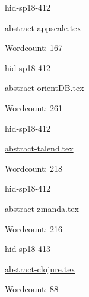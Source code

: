 \begin{IU}

hid-sp18-412

\href{https://github.com/cloudmesh-community/hid-sp18-412/blob/master//technology/abstract-appscale.tex}{abstract-appscale.tex}

 

Wordcount: 167

\end{IU}



\begin{IU}

hid-sp18-412

\href{https://github.com/cloudmesh-community/hid-sp18-412/blob/master//technology/abstract-orientDB.tex}{abstract-orientDB.tex}

 

Wordcount: 261

\end{IU}



\begin{IU}

hid-sp18-412

\href{https://github.com/cloudmesh-community/hid-sp18-412/blob/master//technology/abstract-talend.tex}{abstract-talend.tex}

 

Wordcount: 218

\end{IU}



\begin{IU}

hid-sp18-412

\href{https://github.com/cloudmesh-community/hid-sp18-412/blob/master//technology/abstract-zmanda.tex}{abstract-zmanda.tex}

 

Wordcount: 216

\end{IU}



\begin{IU}

hid-sp18-413

\href{https://github.com/cloudmesh-community/hid-sp18-413/blob/master//technology/abstract-clojure.tex}{abstract-clojure.tex}

 

Wordcount: 88

\end{IU}

